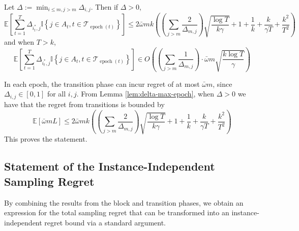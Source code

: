 \documentclass[opre,blindrev]{informs3}
\newcommand{\epoch}{\operatorname{epoch}}
\newcommand{\ind}[1]{\mathbb{I}\left\{#1\right\}}
\newcommand{\bE}[1]{{\mathbb{E}\left[#1\right]}}
\begin{document}
\begin{APPENDICES}
\begin{lemma}\label{lem:delta-transition-regret}
    Let \(\Delta:=\min_{i\leq m, j>m}\Delta_{i,j}\). Then if \(\Delta>0\),
    \[\bE{\sum_{t=1}^T\Delta_{i^*_t, j}\ind{j\in A_t, t\in \mathcal{T}_{\epoch(t)}}}\leq 2\bar{\omega}mk\left(\left(\sum_{j>m}\frac{2}{\Delta_{m,j}}\right)\sqrt{\frac{\log T}{k\gamma}}+1+\frac{1}{k}+\frac{k}{\gamma T}+\frac{k^2}{T^2}\right)\]
    and when \(T>k\),
    \[\bE{\sum_{t=1}^T\Delta_{i^*_t, j}\ind{j\in A_t, t\in \mathcal{T}_{\epoch(t)}}} \in O\!\left(\left(\sum_{j>m}\frac{1}{\Delta_{m,j}}\right)\cdot \bar{\omega}m\sqrt{\frac{k\log T}{\gamma}}\right)\]
\end{lemma}
    In each epoch, the transition phase can incur regret of at most \(\bar{\omega} m\), since \(\Delta_{i,j}\in [0,1]\) for all \(i,j\). From Lemma \ref{lem:delta-max-epoch}, when \(\Delta>0\) we have that the regret from transitions is bounded by
    \[\bE{\bar{\omega}mL}\leq 2\bar{\omega}mk\left(\left(\sum_{j>m}\frac{2}{\Delta_{m,j}}\right)\sqrt{\frac{\log T}{k\gamma}}+1+\frac{1}{k}+\frac{k}{\gamma T}+\frac{k^2}{T^2}\right)\]
    This proves the statement.
\Halmos

\subsection{Statement of the Instance-Independent Sampling Regret}
By combining the results from the block and transition phases, we obtain an expression for the total sampling regret that can be transformed into an instance-independent regret bound via a standard argument.


\end{APPENDICES}
\end{document}
